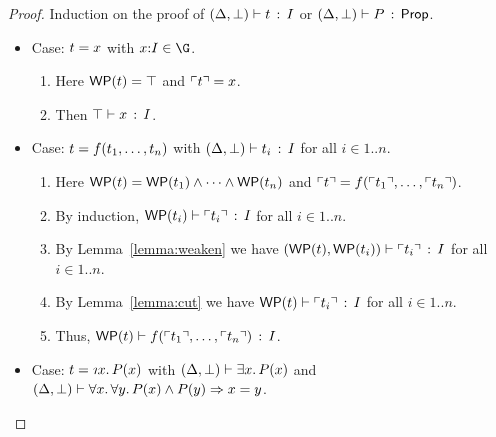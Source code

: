 \documentclass[10pt,letter]{article}
\begin{document}
\begin{proof}
  \raggedright Induction on the proof of
  $(\Delta,\bot) \vdash t\, :\, I$ or $(\Delta,\bot) \vdash P\, :\, \mathsf{Prop}$.
  \begin{itemize}
  \item Case: $t = x$ with $\x{:}\I\in\G$.  
    \begin{enumerate}
      \item
        Here $\mathop{\mathsf{WP}}(t) = \top$ and $\ulcorner t \urcorner = x$.
      \item
        Then $\top \vdash x\, :\, I$.
      \end{enumerate}
  \item Case: $t = f({t}_1,\ldots,{t}_{n})$ with
    $(\Delta,\bot) \vdash t_i\, :\, I$ for all $i\in1..n$.
    \begin{enumerate}
    \item
      Here $\mathop{\mathsf{WP}}(t) =
      \mathop{\mathsf{WP}}(t_1) \wedge \cdots \wedge \mathop{\mathsf{WP}}(t_n)$
      and $\ulcorner t \urcorner = f(\ulcorner t_1 \urcorner,\ldots,\ulcorner t_n \urcorner)$.
    \item 
    	By induction,
        $\mathop{\mathsf{WP}}(t_i) \vdash \ulcorner t_i \urcorner\, :\, I$ for
      all $i\in1..n$.  
    \item 
      By Lemma~\ref{lemma:weaken} we have
      $(\mathop{\mathsf{WP}}(t),\mathop{\mathsf{WP}}(t_i)) \vdash \ulcorner t_i \urcorner\, :\, I$
      for all $i\in1..n$.
    \item
      By Lemma~\ref{lemma:cut} we have
      $\mathop{\mathsf{WP}}(t) \vdash \ulcorner t_i \urcorner\, :\, I$ for
      all $i\in1..n$.  
    \item Thus,
      $\mathop{\mathsf{WP}}(t) \vdash f(\ulcorner t_1 \urcorner,\ldots,\ulcorner t_n \urcorner)\, :\, I$.  
    \end{enumerate}
    
  \goodbreak
    
  \item Case: $\t = \tDesc{\x}{\I}{\p(\x)}$ with
  $(\Delta,\bot) \vdash \exists x.\, P(x)$ and 
  $(\Delta,\bot) \vdash \forall x.\, \forall y.\, P(x) \wedge P(y) \Rightarrow x=y$.


\end{itemize}
\end{proof}
\end{document}
